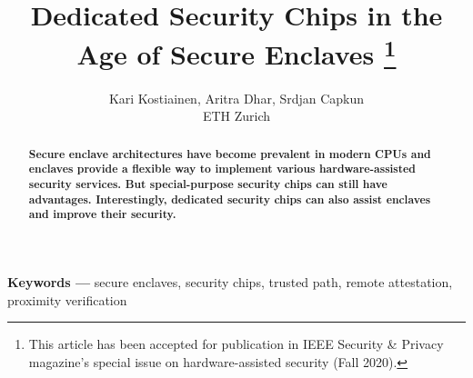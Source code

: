 \documentclass[letterpaper,twocolumn,10pt]{article}
\title{Dedicated Security Chips in the Age of Secure Enclaves
%
\thanks{This article has been accepted for publication in IEEE Security \& Privacy magazine's special issue on hardware-assisted security (Fall 2020).}}
\author{Kari Kostiainen, Aritra Dhar, Srdjan Capkun \\ ETH Zurich}
\begin{document}
\maketitle
\thispagestyle{empty}

\begin{abstract}
\textbf{Secure enclave architectures have become prevalent in modern CPUs and enclaves provide a flexible way to implement various hardware-assisted security services. But special-purpose security chips can still have advantages. Interestingly, dedicated security chips can also assist enclaves and improve their security.}
\end{abstract}

\vspace{10pt}
\noindent
\textbf{Keywords ---} secure enclaves, security chips, trusted path, remote attestation, proximity verification








{\small
 

}
 
\end{document}
